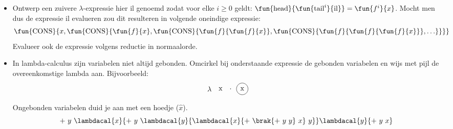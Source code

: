 \documentclass[fleqn]{article}
\newcommand{\cons}{\mbox{CONS}}
\begin{document}
\begin{question}
\begin{itemize}
 \item Ontwerp een zuivere $\lambda$-expressie hier $\mbox{il}$ genoemd zodat voor elke $i\geq 0$ geldt: $\fun{\mbox{head}}{\fun{\mbox{tail}^i}{\mbox{il}}}=\fun{f^i}{x}$. Mocht men dus de expressie $\mbox{il}$ evalueren zou dit resulteren in volgende oneindige expressie:
 \begin{equation}
  \fun{\cons}{x,\fun{\cons}{ \fun{f}{x}, \fun{\cons}{ \fun{f}{\fun{f}{x}}, \fun{\cons}{ \fun{f}{\fun{f}{\fun{f}{x}}} , \ldots } } }}
 \end{equation}
 Evalueer ook de expressie  volgens reductie in normaalorde.
 \item In lambda-calculus zijn variabelen niet altijd gebonden. Omcirkel bij onderstaande expressie de gebonden variabelen en wijs met pijl de overeenkomstige lambda aan. Bijvoorbeeld:
 \[
 \tikz[baseline]{\node(l){$\lambda$};}\ \tikz[baseline]{\node(y){x};}\ \tikz[baseline]{\node(x){.};}\ \tikz[baseline]{\node[draw,circle](x){x};}
 \]
 Ongebonden variabelen duid je aan met een hoedje ($\hat{x}$).
 \begin{equation}
  +\ y\ \lambdacal{x}{+\ y\ \lambdacal{y}{\lambdacal{x}{+\ \brak{+\ y\ y}\ x}\ y}}\lambdacal{y}{+\ y\ x}
 \end{equation}
\end{itemize}
\end{question}
\end{document}
